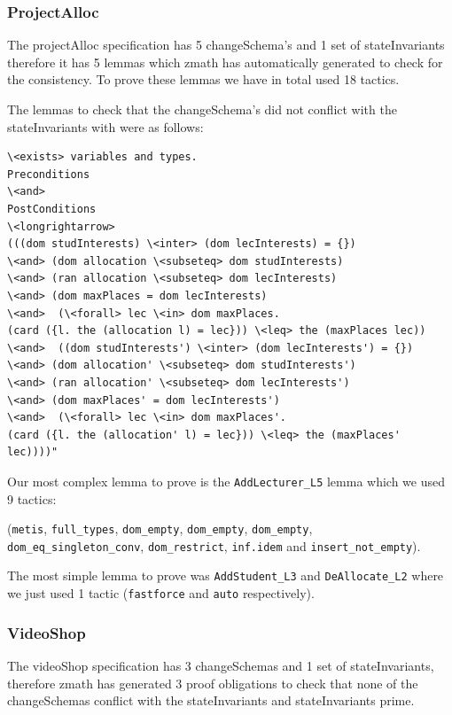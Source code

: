 \subsubsection{ProjectAlloc}

The projectAlloc specification \cite{mathlangexamples} has 5 changeSchema's and 1 set of stateInvariants
therefore it has 5 lemmas which \gls{zmath} has automatically generated to check
for the consistency. To prove these lemmas we have in total used 18 tactics.

The lemmas to check that the changeSchema's did not conflict with
the stateInvariants with were as follows:

\begin{verbatim}
\<exists> variables and types.
Preconditions
\<and>
PostConditions
\<longrightarrow>
(((dom studInterests) \<inter> (dom lecInterests) = {})
\<and> (dom allocation \<subseteq> dom studInterests)
\<and> (ran allocation \<subseteq> dom lecInterests)
\<and> (dom maxPlaces = dom lecInterests)
\<and>  (\<forall> lec \<in> dom maxPlaces.
(card ({l. the (allocation l) = lec})) \<leq> the (maxPlaces lec))
\<and>  ((dom studInterests') \<inter> (dom lecInterests') = {})
\<and> (dom allocation' \<subseteq> dom studInterests')
\<and> (ran allocation' \<subseteq> dom lecInterests')
\<and> (dom maxPlaces' = dom lecInterests')
\<and>  (\<forall> lec \<in> dom maxPlaces'.
(card ({l. the (allocation' l) = lec})) \<leq> the (maxPlaces' lec))))"
\end{verbatim}

Our most complex lemma to prove is the \verb|AddLecturer_L5| lemma which we used
9 tactics:

(\verb|metis|, \verb|full_types|, \verb|dom_empty|, \verb|dom_empty|,
\verb|dom_empty|, \\
 \verb|dom_eq_singleton_conv|, \verb|dom_restrict|,
\verb|inf.idem| and \verb|insert_not_empty|).

The most simple lemma to prove was \verb|AddStudent_L3| and \verb|DeAllocate_L2|
where we just used 1 tactic (\verb|fastforce| and \verb|auto| respectively).

\subsubsection{VideoShop}

The videoShop specification \cite{mathlangexamples} has 3 changeSchemas and 1 set of stateInvariants,
therefore \gls{zmath} has generated 3 proof obligations to check that none of
the changeSchemas conflict with the stateInvariants and stateInvariants prime.

